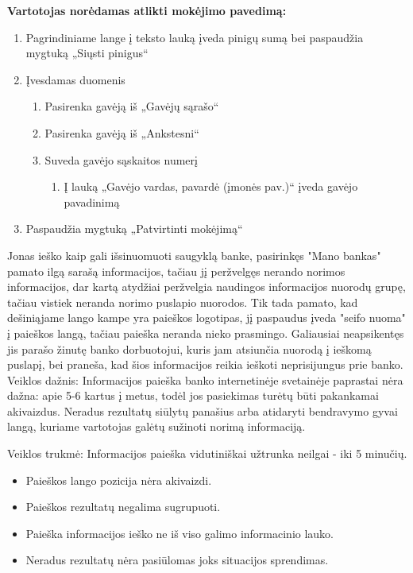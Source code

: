 \documentclass{VUMIFPSkursinis}
\begin{document}
\begin{center}
\textbf{Vartotojas norėdamas atlikti mokėjimo pavedimą:}
\end{center}
\begin{enumerate}
	\item Pagrindiniame lange į teksto lauką įveda pinigų sumą bei paspaudžia mygtuką „Siųsti pinigus“
	\item Įvesdamas duomenis
	\begin{enumerate}
		\item Pasirenka gavėją iš „Gavėjų sąrašo“
		\item Pasirenka gavėją iš „Ankstesni“
		\item Suveda gavėjo sąskaitos numerį
		\begin{enumerate}
			\item Į lauką „Gavėjo vardas, pavardė (įmonės pav.)“ įveda gavėjo pavadinimą
		\end{enumerate}
	\end{enumerate}
	\item Paspaudžia mygtuką „Patvirtinti mokėjimą“
\end{enumerate}
Jonas ieško kaip gali išsinuomuoti saugyklą banke, pasirinkęs "Mano bankas" pamato ilgą sarašą informacijos, tačiau jį peržvelgęs nerando norimos informacijos, dar kartą atydžiai peržvelgia naudingos informacijos nuorodų grupę, tačiau vistiek neranda norimo puslapio nuorodos. Tik tada pamato, kad dešiniąjame lango kampe yra paieškos logotipas, jį paspaudus įveda "seifo nuoma" į paieškos langą, tačiau paieška neranda nieko prasmingo. Galiausiai neapsikentęs jis parašo žinutę banko dorbuotojui, kuris jam atsiunčia nuorodą į ieškomą puslapį, bei praneša, kad šios informacijos reikia ieškoti neprisijungus prie banko. 
Veiklos dažnis: Informacijos paieška banko internetinėje svetainėje paprastai nėra dažna: apie 5-6 kartus į metus, todėl jos pasiekimas turėtų būti pakankamai akivaizdus. Neradus rezultatų siūlytų panašius arba atidaryti bendravymo gyvai langą, kuriame vartotojas galėtų sužinoti norimą informaciją. \par
Veiklos trukmė: Informacijos paieška vidutiniškai užtrunka neilgai - iki 5 minučių.
\begin{itemize}
	\item Paieškos lango pozicija nėra akivaizdi.
	\item Paieškos rezultatų negalima sugrupuoti.
	\item Paieška informacijos ieško ne iš viso galimo informacinio lauko.
	\item Neradus rezultatų nėra pasiūlomas joks situacijos sprendimas.
\end{itemize}
\end{document}
